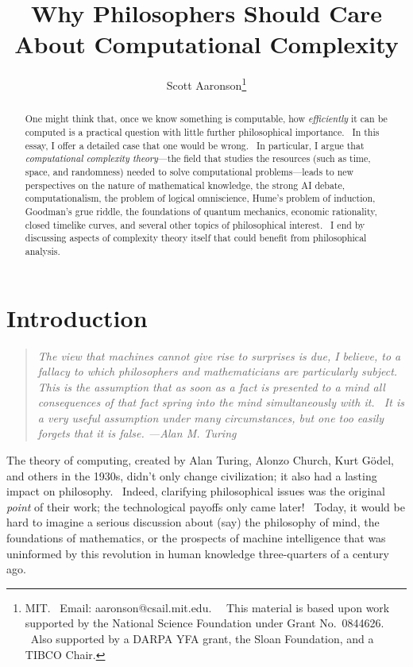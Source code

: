 \documentclass[11pt,onecolumn]{article}%
\begin{document}
\title{Why Philosophers Should Care About Computational Complexity}
\author{Scott Aaronson\thanks{MIT. \ Email: aaronson@csail.mit.edu. \ \ This material
is based upon work supported by the National Science Foundation under Grant
No.\ 0844626. \ Also supported by a DARPA YFA grant, the Sloan Foundation, and
a TIBCO Chair.}}
\date{}
\maketitle

\begin{abstract}
One might think that, once we know something is computable, how
\textit{efficiently} it can be computed is a practical question with little
further philosophical importance. \ In this essay, I offer a detailed case
that one would be wrong. \ In particular, I argue that \textit{computational
complexity theory}---the field that studies the resources (such as time,
space, and randomness) needed to solve computational problems---leads to new
perspectives on the nature of mathematical knowledge, the strong AI debate,
computationalism, the problem of logical omniscience, Hume's problem of
induction, Goodman's grue riddle, the foundations of quantum mechanics,
economic rationality, closed timelike curves, and several other topics of
philosophical interest. \ I end by discussing aspects of complexity theory
itself that could benefit from philosophical analysis.

\end{abstract}
\tableofcontents

\section{Introduction\label{INTRO}}

\begin{quotation}
\noindent\textit{The view that machines cannot give rise to surprises is due,
I believe, to a fallacy to which philosophers and mathematicians are
particularly subject. This is the assumption that as soon as a fact is
presented to a mind all consequences of that fact spring into the mind
simultaneously with it. \ It is a very useful assumption under many
circumstances, but one too easily forgets that it is false. ---Alan M. Turing
\cite{turing:ai}}
\end{quotation}

The theory of computing, created by Alan Turing, Alonzo Church, Kurt
G\"{o}del, and others in the 1930s, didn't only change civilization; it also
had a lasting impact on philosophy. \ Indeed, clarifying philosophical issues
was the original \textit{point} of their work; the technological payoffs only
came later! \ Today, it would be hard to imagine a serious discussion about
(say) the philosophy of mind, the foundations of mathematics, or the prospects
of machine intelligence that was uninformed by this revolution in human
knowledge three-quarters of a century ago.
\end{document}
